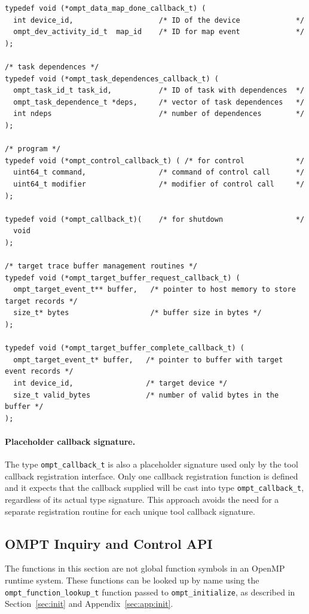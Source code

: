 \documentclass{article}
\begin{document}
{\begin{verbatim}
typedef void (*ompt_data_map_done_callback_t) (
  int device_id,                    /* ID of the device             */
  ompt_dev_activity_id_t  map_id    /* ID for map event             */
);

/* task dependences */
typedef void (*ompt_task_dependences_callback_t) (                                   
  ompt_task_id_t task_id,           /* ID of task with dependences  */
  ompt_task_dependence_t *deps,     /* vector of task dependences   */
  int ndeps                         /* number of dependences        */
);
        
/* program */						   
typedef void (*ompt_control_callback_t) ( /* for control            */	   
  uint64_t command,                 /* command of control call      */
  uint64_t modifier                 /* modifier of control call     */
);
  
typedef void (*ompt_callback_t)(    /* for shutdown                 */	
  void
); 

/* target trace buffer management routines */
typedef void (*ompt_target_buffer_request_callback_t) (
  ompt_target_event_t** buffer,   /* pointer to host memory to store target records */
  size_t* bytes                   /* buffer size in bytes */
);
  
typedef void (*ompt_target_buffer_complete_callback_t) (
  ompt_target_event_t* buffer,   /* pointer to buffer with target event records */
  int device_id,                 /* target device */
  size_t valid_bytes             /* number of valid bytes in the buffer */
);
\end{verbatim}

\paragraph{Placeholder callback signature.} The type \verb|ompt_callback_t| is also a placeholder signature used only by the tool callback registration interface. 
Only one callback registration function is defined and it expects that the callback supplied will be cast into type \verb|ompt_callback_t|, regardless of its actual type signature. This approach avoids the need for a separate registration routine for each unique tool callback signature. 

\clearpage
\subsection{OMPT Inquiry and Control API}

The functions in this section are not global function symbols in an OpenMP runtime system. These functions can be looked up by name using the \verb|ompt_function_lookup_t| function passed to \verb|ompt_initialize|, as described in Section~\ref{sec:init} and Appendix~\ref{sec:app:init}.

}
\end{document}
